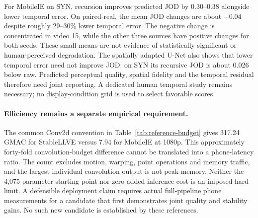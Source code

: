 For MobileIE on SYN, recursion improves predicted JOD by 0.30--0.38
alongside lower temporal error. On paired-real, the mean JOD changes
are about $-0.04$ despite roughly 29--30\% lower temporal error. The
negative change is concentrated in video 15, while the other three
sources have positive changes for both seeds. These small means are
not evidence of statistically significant or human-perceived degradation.
The spatially adapted U-Net also shows that lower temporal error need
not improve JOD: on SYN its recursive JOD is about 0.026 below raw.
Predicted perceptual quality, spatial fidelity and the temporal residual
therefore need joint reporting. A dedicated human temporal study remains
necessary; no display-condition grid is used to select favorable scores.

\paragraph{Efficiency remains a separate empirical requirement.}

The common Conv2d convention in Table~\ref{tab:reference-budget} gives
317.24\,GMAC for StableLLVE versus 7.94 for MobileIE at 1080p. This
approximately forty-fold convolution-budget difference cannot be
translated into a phone-latency ratio. The count excludes motion,
warping, point operations and memory traffic, and the largest individual
convolution output is not peak memory. Neither the 4,075-parameter
starting point nor zero added inference cost is an imposed hard limit.
A defensible deployment claim requires actual full-pipeline phone
measurements for a candidate that first demonstrates joint quality and
stability gains. No such new candidate is established by these references.
